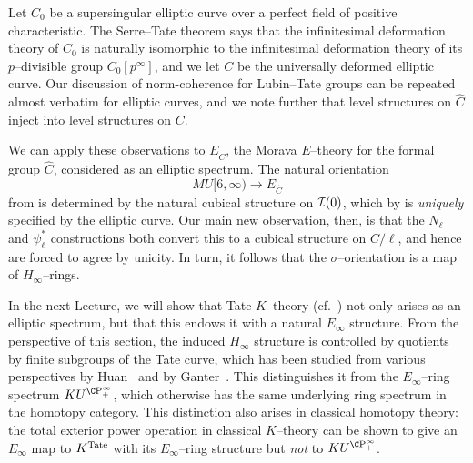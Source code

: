 \begin{example}
Let \(C_0\) be a supersingular elliptic curve over a perfect field of positive characteristic.  The Serre--Tate theorem says that the infinitesimal deformation theory of \(C_0\) is naturally isomorphic to the infinitesimal deformation theory of its \(p\)--divisible group \(C_0[p^\infty]\), and we let \(C\) be the universally deformed elliptic curve.  Our discussion of norm-coherence for Lubin--Tate groups can be repeated almost verbatim for elliptic curves, and we note further that level structures on \(\widehat C\) inject into level structures on \(C\).

We can apply these observations to \(E_{\widehat C}\), the Morava \(E\)--theory for the formal group \(\widehat C\), considered as an elliptic spectrum.  The natural orientation \[MU[6, \infty) \to E_{\widehat C}\] from  is determined by the natural cubical structure on \(\mathcal{I}(0)\), which by  is \emph{uniquely} specified by the elliptic curve.  Our main new observation, then, is that the \(N_\ell\) and \(\psi_\ell^*\) constructions both convert this to a cubical structure on \(C / \ell\), and hence are forced to agree by unicity.  In turn, it follows that the \(\sigma\)--orientation is a map of \(H_\infty\)--rings.
\end{example}

\begin{remark}
In the next Lecture, we will show that Tate \(K\)--theory (cf.\ ) not only arises as an elliptic spectrum, but that this endows it with a natural \(E_\infty\) structure.  From the perspective of this section, the induced \(H_\infty\) structure is controlled by quotients by finite subgroups of the Tate curve, which has been studied from various perspectives by Huan~\cite{Huan} and by Ganter~\cite{GanterStringyOpns,GanterPowerOpnsInTateKthy}.  This distinguishes it from the \(E_\infty\)--ring spectrum \(KU^{\CP^\infty_+}\), which otherwise has the same underlying ring spectrum in the homotopy category.  This distinction also arises in classical homotopy theory: the total exterior power operation in classical \(K\)--theory can be shown to give an \(E_\infty\) map to \(K^{\mathrm{Tate}}\) with its \(E_\infty\)--ring structure but \emph{not} to \(KU^{\CP^\infty_+}\).
\end{remark}

















